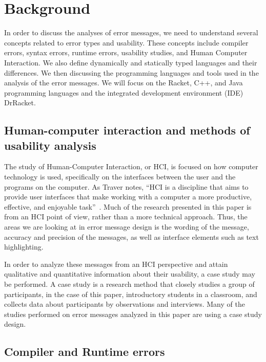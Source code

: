 \documentclass{sig-alternate}
\begin{document}
\section{Background}\label{sec:background}
In order to discuss the analyses of error messages, we need to understand several concepts related to error types and usability.
These concepts include compiler errors, syntax errors, runtime errors, usability studies, and Human Computer Interaction.
We also define dynamically and statically typed languages and their differences.
We then discussing the programming languages and tools used in the analysis of the error messages.
We will focus on the Racket, C++, and Java programming languages and the integrated development environment (IDE) DrRacket.


\subsection{Human-computer interaction and methods of usability analysis}\label{subsec:hci}

The study of Human-Computer Interaction, or HCI, is focused on how computer technology is used, specifically on the interfaces between the user and the programs on the computer.
As Traver notes, ``HCI is a discipline that aims to provide user interfaces that make working with a computer a more productive, effective, and enjoyable task''~\cite{Traver:2010}.
Much of the research presented in this paper is from an HCI point of view, rather than a more technical approach.
Thus, the areas we are looking at in error message design is the wording of the message, accuracy and precision of the messages, as well as interface elements such as text highlighting.

In order to analyze these messages from an HCI perspective and attain qualitative and quantitative information about their usability, a case study may be performed.
A case study is a research method that closely studies a group of participants, in the case of this paper, introductory students in a classroom, and collects data about participants by observations and interviews.
Many of the studies performed on error messages analyzed in this paper are using a case study design. 

\subsection{Compiler and Runtime errors}\label{subsec:error types}
\end{document}
